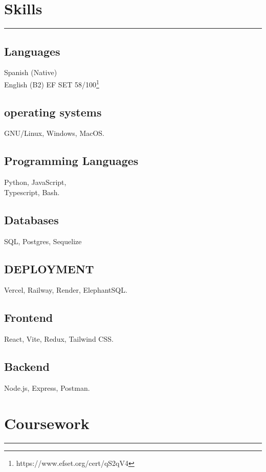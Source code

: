 \documentclass[]{rahulworld-resume}
\begin{document}
\begin{minipage}[t]{0.33\textwidth}
\section{Skills}
\noindent\rule{5cm}{0.4pt}
\subsection{Languages}
Spanish (Native)\\
English (B2) EF SET 58/100\footnote{https://www.efset.org/cert/qS2qV4}\\
\vspace{1pt}
\subsection{operating systems}
GNU/Linux, Windows, MacOS.\\
\vspace{1pt}
\subsection{Programming Languages}
Python, JavaScript, \\
Typescript, Bash. \\
\vspace{1pt}
\subsection{Databases}
SQL, Postgres, Sequelize\\
\subsection{DEPLOYMENT}
Vercel, Railway, Render, ElephantSQL.\\
\vspace{1pt}
\subsection{Frontend}
React, Vite, Redux, Tailwind CSS.\\
\vspace{1pt}
\subsection{Backend}
Node.js, Express, Postman.\\

\sectionsep
\section{Coursework}
\noindent\rule{5cm}{0.4pt}


\end{minipage}
\end{document}
